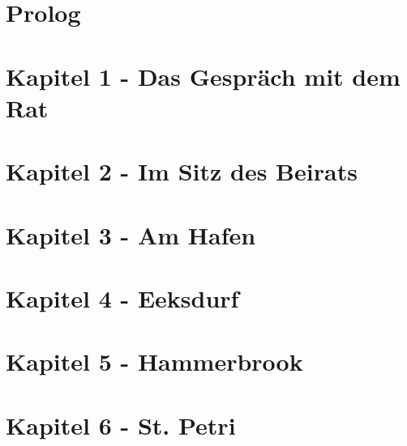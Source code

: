 
\section{\textbf{Prolog}}


\section{\textbf{Kapitel 1 - Das Gespräch mit dem Rat}}



\section{\textbf{Kapitel 2 - Im Sitz des Beirats}}



\section{\textbf{Kapitel 3 - Am Hafen}}
\label{Hafen}


\section{\textbf{Kapitel 4 - Eeksdurf}}
\label{xd}


\section{\textbf{Kapitel 5 - Hammerbrook}}
\label{arm}


\section{\textbf{Kapitel 6 - St. Petri}}
\label{Petri}


%
